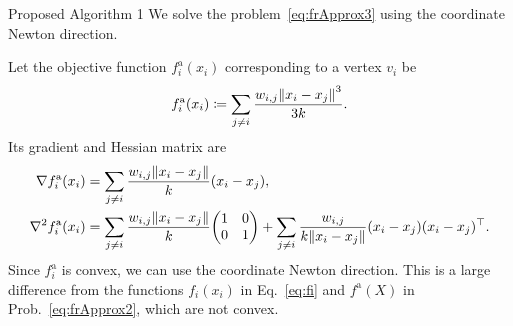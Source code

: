 \documentclass[dvipdfmx,13pt,aspectratio=169]{beamer}
\newcommand{\defeq}{\coloneqq}
\begin{document}
\begin{frame}{Proposed Algorithm 1}
  We solve the problem~\eqref{eq:frApprox3} using the coordinate Newton direction.

  Let the objective function $f^{\mathrm{a}}_i(x_i)$ corresponding to a vertex $v_i$ be
  \begin{equation*}
    f^{\mathrm{a}}_i(x_i) \defeq \sum_{j \neq i} \frac{w_{i,j}\norm{x_i - x_j}^3}{3k}.
  \end{equation*}
  Its gradient and Hessian matrix are
  \begin{align*}
    \nabla f^{\mathrm{a}}_i(x_i)   & = \sum_{j \neq i} \frac{w_{i,j}\norm{x_i - x_j}}{k} (x_i - x_j),     \\
    \nabla^2 f^{\mathrm{a}}_i(x_i) & = \sum_{j \neq i} \frac{w_{i,j}\norm{x_i - x_j}}{k} \mqty(1      & 0 \\0&1) + \sum_{j \neq i} \frac{w_{i,j}}{k\norm{x_i - x_j}} (x_i - x_j)(x_i - x_j)^\top.
  \end{align*}
  Since $f^{\mathrm{a}}_i$ is convex, we can use the coordinate Newton direction.
  This is a large difference from the functions $f_i(x_i)$ in Eq.~\eqref{eq:fi} and $f^{\mathrm{a}}(X)$ in Prob.~\eqref{eq:frApprox2}, which are not convex.
\end{frame}
\end{document}
